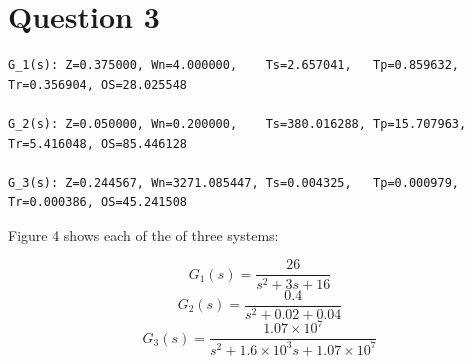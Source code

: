 \documentclass[a4paper,11pt]{article}
\begin{document}
\section*{Question 3}
\begin{figure}[h]
        \centering
        \caption{}
\end{figure} 

\begin{verbatim}
G_1(s): Z=0.375000, Wn=4.000000,    Ts=2.657041,   Tp=0.859632,  Tr=0.356904, OS=28.025548 

G_2(s): Z=0.050000, Wn=0.200000,    Ts=380.016288, Tp=15.707963, Tr=5.416048, OS=85.446128 

G_3(s): Z=0.244567, Wn=3271.085447, Ts=0.004325,   Tp=0.000979,  Tr=0.000386, OS=45.241508 
\end{verbatim}

Figure 4 shows each of the of three systems: 

$$G_{1}(s)=\frac{26}{s^2 + 3s + 16}$$
$$G_{2}(s)=\frac{0.4}{s^2 + 0.02 + 0.04}$$
$$G_{3}(s)=\frac{1.07{\times}10^7}{s^2 + 1.6{\times}10^3s + 1.07{\times}10^7}$$
\end{document}
